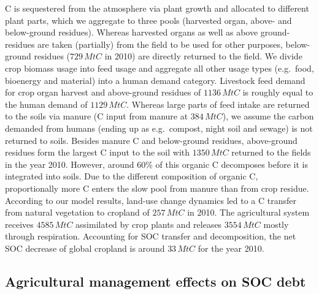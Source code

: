 \documentclass[gc, manuscript]{copernicus}
\begin{document}
C is sequestered from the atmosphere via plant growth and allocated to different plant parts, which we aggregate to three pools (harvested organ, above- and below-ground residues). Whereas harvested organs as well as above ground-residues are taken (partially) from the field to be used for other purposes, below-ground residues (\(729\,\unit{MtC}\) in 2010) are directly returned to the field. We divide crop biomass usage into feed usage and aggregate all other usage types (e.g.~food, bioenergy and material) into a human demand category. Livestock feed demand for crop organ harvest and above-ground residues of \(1136\,\unit{MtC}\) is roughly equal to the human demand of \(1129\,\unit{MtC}\). Whereas large parts of feed intake are returned to the soils via manure (C input from manure at \(384\,\unit{MtC}\)), we assume the carbon demanded from humans (ending up as e.g.~compost, night soil and sewage) is not returned to soils. Besides manure C and below-ground residues, above-ground residues form the largest C input to the soil with \(1350\,\unit{MtC}\) returned to the fields in the year 2010. However, around 60\% of this organic C decomposes before it is integrated into soils. Due to the different composition of organic C, proportionally more C enters the slow pool from manure than from crop residue.
According to our model results, land-use change dynamics led to a C transfer from natural vegetation to cropland of \(257\,\unit{MtC}\) in 2010. The agricultural system receives \(4585\,\unit{MtC}\) assimilated by crop plants and releases \(3554\,\unit{MtC}\) mostly through respiration. Accounting for SOC transfer and decomposition, the net SOC decrease of global cropland is around \(33\,\unit{MtC}\) for the year 2010.

\hypertarget{agricultural-management-effects-on-soc-debt}{%
\subsection{Agricultural management effects on SOC debt}\label{agricultural-management-effects-on-soc-debt}}
\end{document}
